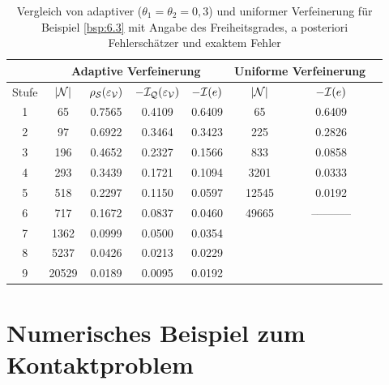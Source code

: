 \begin{bsp}
\begin{table}[h]
\centering
\begin{tabular}[c]{|c|c|c|c|c|c|c|c|}
	\hline
	 & \multicolumn{4}{c|}{Adaptive Verfeinerung} & \multicolumn{2}{c|}{Uniforme Verfeinerung} \\
	\hline
	Stufe & $\lvert \mathcal N\rvert$ & $\rho_{\mathcal S}(\varepsilon_{\mathcal V})$ & $-\mathcal I_{\mathcal Q} (\varepsilon_{\mathcal V})$ & $-\mathcal I(e)$ & $\lvert \mathcal N\rvert$ & $-\mathcal I (e)$ \\
	\hline
	 1 &  65   &  0.7565 & 0.4109 & 0.6409 & 65 & 0.6409 \\
	 2 &  97 & 0.6922 &0.3464  & 0.3423 & 225 & 0.2826 \\
	 3 & 196  & 0.4652 &  0.2327& 0.1566 & 833 &0.0858  \\
	 4 & 293  & 0.3439 &0.1721 & 0.1094 & 3201 & 0.0333  \\
	 5 &518  & 0.2297 & 0.1150 &  0.0597 &  12545 & 0.0192 \\
	 6 &  717 & 0.1672 & 0.0837 &  0.0460& 49665 &  ––––––– \\
	 7 & 1362 & 0.0999 &0.0500  & 0.0354 & &  \\
	 8 & 5237 & 0.0426 & 0.0213 & 0.0229 &  &  \\
	 9 & 20529 &  0.0189 &0.0095  & 0.0192 & & \\
	\hline
\end{tabular}
\caption[Vergleich von adaptiver und uniformer Verfeinerung für Beispiel \ref{bsp:6.3}]{\label{tab:6.3}Vergleich von adaptiver ($\theta_1=\theta_2=0,3$) und uniformer Verfeinerung für Beispiel \ref{bsp:6.3} mit Angabe des Freiheitsgrades, a posteriori Fehlerschätzer und exaktem Fehler}
\end{table}
\end{bsp}
    
       
\clearpage

\section{Numerisches Beispiel zum Kontaktproblem}
\label{kap:6.2}



